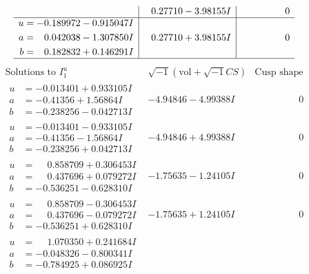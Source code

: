 \documentclass[1p]{elsarticle_modified}
\theoremstyle{definition}
\newcommand{\I}{\sqrt{-1}}
\begin{document}
$$\begin{array}{c|c|c}
 & \phantom{-}0.27710 - 3.98155 I & \phantom{-0.000000 } 0 \\ \hline\begin{aligned}
u &= -0.189972 - 0.915047 I \\
a &= \phantom{-}0.042038 - 1.307850 I \\
b &= \phantom{-}0.182832 + 0.146291 I\end{aligned}
 & \phantom{-}0.27710 + 3.98155 I & \phantom{-0.000000 } 0\\
 \hline 
 \end{array}$$\newpage$$\begin{array}{c|c|c}  
\text{Solutions to }I^u_{1}& \I (\text{vol} + \sqrt{-1}CS) & \text{Cusp shape}\\
 \hline 
\begin{aligned}
u &= -0.013401 + 0.933105 I \\
a &= -0.41356 + 1.56864 I \\
b &= -0.238256 - 0.042713 I\end{aligned}
 & -4.94846 - 4.99388 I & \phantom{-0.000000 } 0 \\ \hline\begin{aligned}
u &= -0.013401 - 0.933105 I \\
a &= -0.41356 - 1.56864 I \\
b &= -0.238256 + 0.042713 I\end{aligned}
 & -4.94846 + 4.99388 I & \phantom{-0.000000 } 0 \\ \hline\begin{aligned}
u &= \phantom{-}0.858709 + 0.306453 I \\
a &= \phantom{-}0.437696 + 0.079272 I \\
b &= -0.536251 - 0.628310 I\end{aligned}
 & -1.75635 - 1.24105 I & \phantom{-0.000000 } 0 \\ \hline\begin{aligned}
u &= \phantom{-}0.858709 - 0.306453 I \\
a &= \phantom{-}0.437696 - 0.079272 I \\
b &= -0.536251 + 0.628310 I\end{aligned}
 & -1.75635 + 1.24105 I & \phantom{-0.000000 } 0 \\ \hline\begin{aligned}
u &= \phantom{-}1.070350 + 0.241684 I \\
a &= -0.048326 - 0.800341 I \\
b &= -0.784925 + 0.086925 I\end{aligned}

\end{array}$$
\end{document}
